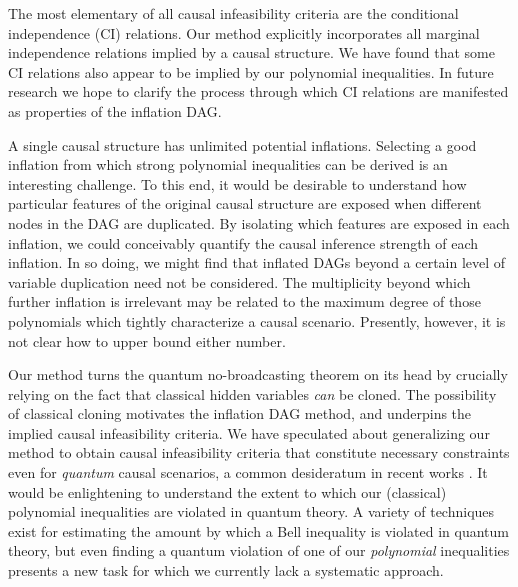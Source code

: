 The most elementary of all causal infeasibility criteria are the conditional independence (CI) relations. Our method explicitly incorporates all marginal independence relations implied by a causal structure. We have found that some CI relations also appear to be implied by our polynomial inequalities. In future research we hope to clarify the process through which CI relations are manifested as properties of the inflation DAG.

A single causal structure has unlimited potential inflations. Selecting a good inflation from which strong polynomial inequalities can be derived is an interesting challenge. To this end, it would be desirable to understand how particular features of the original causal structure are exposed when different nodes in the DAG are duplicated. By isolating which features are exposed in each inflation, we could conceivably quantify the causal inference strength of each inflation. In so doing, we might find that inflated DAGs beyond a certain level of variable duplication need not be considered. The multiplicity beyond which further inflation is irrelevant may be related to the maximum degree of those polynomials which tightly characterize a causal scenario. Presently, however, it is not clear how to upper bound either number.


Our method turns the quantum no-broadcasting theorem \cite{NoCloningQuantum1996,NoCloningGeneral2006} on its head by crucially relying on the fact that classical hidden variables \emph{can} be cloned. The possibility of classical cloning motivates the inflation DAG method, and underpins the implied causal infeasibility criteria. We have speculated about generalizing our method to obtain causal infeasibility criteria that constitute necessary constraints even for \emph{quantum} causal scenarios, a common desideratum in recent works \cite{fritz2012bell,pusey2014gdag,Chaves2015infoquantum,ChavesNoSignalling,BeyondBellII}. It would be enlightening to understand the extent to which our (classical) polynomial inequalities are violated in quantum theory. A variety of techniques exist for estimating the amount by which a Bell inequality \cite{NPA2008Long,I3322NPA1} is violated in quantum theory, but even finding a quantum violation of one of our \emph{polynomial} inequalities presents a new task for which we currently lack a systematic approach.

